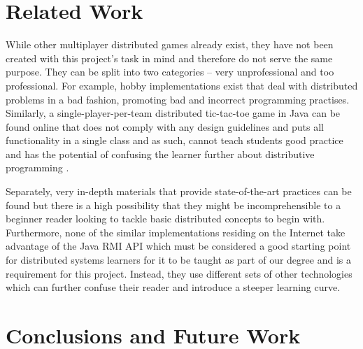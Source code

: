 \documentclass[conference]{IEEEtran}
\begin{document}
\section{Related Work}
While other multiplayer distributed games already exist, they have not been
created with this project’s task in mind and therefore do not serve the same
purpose. They can be split into two categories – very unprofessional and too
professional. For example, hobby implementations exist that deal with
distributed problems in a bad fashion, promoting bad and incorrect programming 
practises. Similarly, a single-player-per-team distributed tic-tac-toe game in 
Java can be found online that does not comply with any design guidelines and 
puts all functionality in a single class and as such, cannot teach students good 
practice and has the potential of confusing the learner further about distributive 
programming \cite{MrWayFarOutYoutube15}.

Separately, very in-depth materials that provide state-of-the-art practices can 
be found \cite{DBLP:conf/nsdi/BharambePS06} but there is a high possibility that they might be incomprehensible 
to a beginner reader looking to tackle basic distributed concepts to begin with. 
Furthermore, none of the similar implementations residing on the Internet take advantage 
of the Java RMI API which must be considered a good starting point for distributed systems
learners for it to be taught as part of our degree and is a requirement for this
project. Instead, they use different sets of other technologies which can
further confuse their reader and introduce a steeper learning curve.

\section{Conclusions and Future Work}





\end{document}
